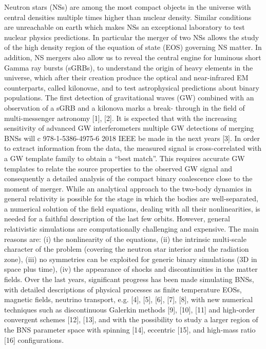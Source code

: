 \documentclass{ut-thesis}
\begin{document}
Neutron stars (NSs) are among the most compact objects in
the universe with central densities multiple times higher than
nuclear density. Similar conditions are unreachable on earth
which makes NSs an exceptional laboratory to test nuclear
physics predictions. In particular the merger of two NSs
allows the study of the high density region of the equation
of state (EOS) governing NS matter. In addition, NS mergers
also allow us to reveal the central engine for luminous short
Gamma ray bursts (sGRBs), to understand the origin of
heavy elements in the universe, which after their creation
produce the optical and near-infrared EM counterparts, called
kilonovae, and to test astrophysical predictions about binary
populations.
The first detection of gravitational waves (GW) combined
with an observation of a sGRB and a kilonova marks a break-
through in the field of multi-messenger astronomy [1], [2]. It is
expected that with the increasing sensitivity of advanced GW
interferometers multiple GW detections of merging BNSs will
c
978-1-5386-4975-6 
2018
IEEE
be made in the next years [3]. In order to extract information
from the data, the measured signal is cross-correlated with a
GW template family to obtain a “best match”. This requires
accurate GW templates to relate the source properties to the
observed GW signal and consequently a detailed analysis of
the compact binary coalescence close to the moment of merger.
While an analytical approach to the two-body dynamics
in general relativity is possible for the stage in which the
bodies are well-separated, a numerical solution of the field
equations, dealing with all their nonlinearities, is needed for
a faithful description of the last few orbits. However, general
relativistic simulations are computationally challenging and
expensive. The main reasons are: (i) the nonlinearity of
the equations, (ii) the intrinsic multi-scale character of the
problem (covering the neutron star interior and the radiation
zone), (iii) no symmetries can be exploited for generic binary
simulations (3D in space plus time), (iv) the appearance
of shocks and discontinuities in the matter fields. Over the
last years, significant progress has been made simulating
BNSs, with detailed descriptions of physical processes as
finite temperature EOSs, magnetic fields, neutrino transport,
e.g. [4], [5], [6], [7], [8], with new numerical techniques
such as discontinuous Galerkin methods [9], [10], [11] and
high-order convergent schemes [12], [13], and with the
possibility to study a larger region of the BNS parameter
space with spinning [14], eccentric [15], and high-mass
ratio [16] configurations.
\end{document}
